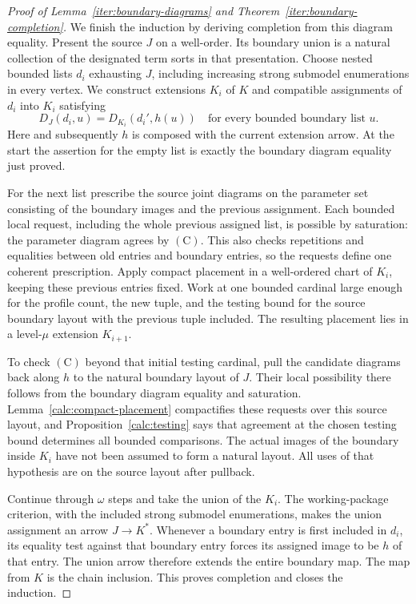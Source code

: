 \begin{proof}[Proof of Lemma~\ref{iter:boundary-diagrams} and
Theorem~\ref{iter:boundary-completion}]
We finish the induction by deriving completion from this
diagram equality. Present the source $J$ on a well-order.
Its boundary union is a natural collection of the
designated term sorts in that presentation. Choose nested
bounded lists $d_i$ exhausting $J$, including increasing
strong submodel enumerations in every vertex. We construct
extensions $K_i$ of $K$ and compatible assignments of
$d_i$ into $K_i$ satisfying
\[
 D_J(d_i,u)=D_{K_i}(d_i',h(u))
 \quad\text{for every bounded boundary list }u.
 \tag{C}
\]
Here and subsequently $h$ is composed with the current
extension arrow. At the start the assertion for the empty
list is exactly the boundary diagram equality just proved.

For the next list prescribe the source joint diagrams on
the parameter set consisting of the boundary images and
the previous assignment. Each bounded local request,
including the whole previous assigned list, is possible
by saturation: the parameter diagram agrees by $(\mathrm C)$.
This also checks repetitions and equalities between old
entries and boundary entries, so the requests define one
coherent prescription. Apply compact placement in a
well-ordered chart of $K_i$, keeping these previous
entries fixed. Work at one bounded cardinal large enough
for the profile count, the new tuple, and the testing
bound for the source boundary layout with the previous
tuple included. The resulting placement lies in a
level-$\mu$ extension $K_{i+1}$.

To check $(\mathrm C)$ beyond that initial testing cardinal,
pull the candidate diagrams back along $h$ to the natural
boundary layout of $J$. Their local possibility there
follows from the boundary diagram equality and saturation.
Lemma~\ref{calc:compact-placement} compactifies these
requests over this source layout, and
Proposition~\ref{calc:testing} says that agreement at the chosen
testing bound determines all bounded comparisons.
The actual images of the boundary inside $K_i$ have not
been assumed to form a natural layout. All uses of that
hypothesis are on the source layout after pullback.

Continue through $\omega$ steps and take the union of the
$K_i$. The working-package criterion, with the included
strong submodel enumerations, makes the union assignment
an arrow $J\to K^*$. Whenever a boundary entry is first
included in $d_i$, its equality test against that boundary
entry forces its assigned image to be $h$ of that entry.
The union arrow therefore extends the entire boundary
map. The map from $K$ is the chain inclusion. This proves
completion and closes the induction.
\end{proof}

